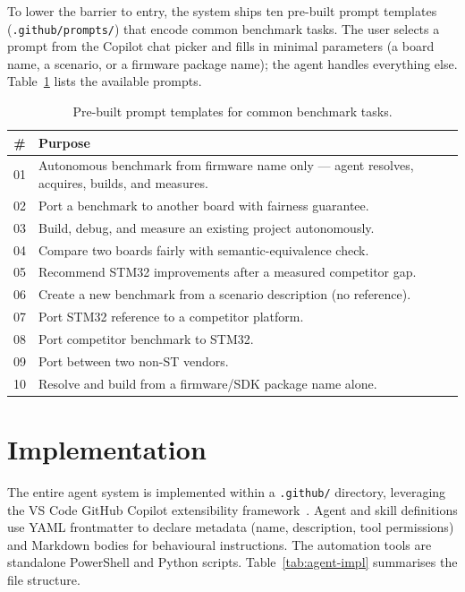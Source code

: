 To lower the barrier to entry, the system ships ten pre-built prompt templates
(\texttt{.github/prompts/}) that encode common benchmark tasks. The user selects a prompt
from the Copilot chat picker and fills in minimal parameters (a board name, a scenario, or
a firmware package name); the agent handles everything else. Table~\ref{tab:agent-prompts}
lists the available prompts.

\begin{table}[H]
\centering
\caption{Pre-built prompt templates for common benchmark tasks.}
\label{tab:agent-prompts}
\begin{tabularx}{\textwidth}{c X}
\toprule
\textbf{\#} & \textbf{Purpose} \\
\midrule
01 & Autonomous benchmark from firmware name only --- agent resolves, acquires, builds, and measures. \\
02 & Port a benchmark to another board with fairness guarantee. \\
03 & Build, debug, and measure an existing project autonomously. \\
04 & Compare two boards fairly with semantic-equivalence check. \\
05 & Recommend STM32 improvements after a measured competitor gap. \\
06 & Create a new benchmark from a scenario description (no reference). \\
07 & Port STM32 reference to a competitor platform. \\
08 & Port competitor benchmark to STM32. \\
09 & Port between two non-ST vendors. \\
10 & Resolve and build from a firmware/SDK package name alone. \\
\bottomrule
\end{tabularx}
\end{table}

\section{Implementation}
\label{sec:agent-implementation}

The entire agent system is implemented within a \texttt{.github/} directory, leveraging the
VS Code GitHub Copilot extensibility framework~\cite{github-copilot, vscode-agent-mode,
vscode-custom-agents}.
Agent and skill definitions use YAML frontmatter to declare metadata (name, description,
tool permissions) and Markdown bodies for behavioural instructions. The automation tools are
standalone PowerShell and Python scripts. Table~\ref{tab:agent-impl} summarises the file
structure.

